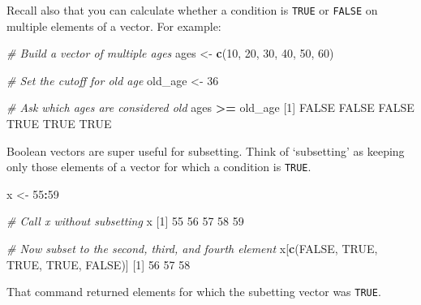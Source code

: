 \documentclass[
]{book}
\newenvironment{Shaded}{\begin{snugshade}}{\end{snugshade}}
\newcommand{\CommentTok}[1]{\textcolor[rgb]{0.56,0.35,0.01}{\textit{#1}}}
\newcommand{\ConstantTok}[1]{\textcolor[rgb]{0.56,0.35,0.01}{#1}}
\newcommand{\DecValTok}[1]{\textcolor[rgb]{0.00,0.00,0.81}{#1}}
\newcommand{\FunctionTok}[1]{\textcolor[rgb]{0.13,0.29,0.53}{\textbf{#1}}}
\newcommand{\NormalTok}[1]{#1}
\newcommand{\OtherTok}[1]{\textcolor[rgb]{0.56,0.35,0.01}{#1}}
\newcommand{\SpecialCharTok}[1]{\textcolor[rgb]{0.81,0.36,0.00}{\textbf{#1}}}
\begin{document}
Recall also that you can calculate whether a condition is \texttt{TRUE} or \texttt{FALSE} on multiple elements of a vector. For example:

\begin{Shaded}
\begin{Highlighting}[]
\CommentTok{\# Build a vector of multiple ages}
\NormalTok{ages }\OtherTok{\textless{}{-}} \FunctionTok{c}\NormalTok{(}\DecValTok{10}\NormalTok{, }\DecValTok{20}\NormalTok{, }\DecValTok{30}\NormalTok{, }\DecValTok{40}\NormalTok{, }\DecValTok{50}\NormalTok{, }\DecValTok{60}\NormalTok{)}

\CommentTok{\# Set the cutoff for old age}
\NormalTok{old\_age }\OtherTok{\textless{}{-}} \DecValTok{36}

\CommentTok{\# Ask which ages are considered old}
\NormalTok{ages }\SpecialCharTok{\textgreater{}=}\NormalTok{ old\_age}
\NormalTok{[}\DecValTok{1}\NormalTok{] }\ConstantTok{FALSE} \ConstantTok{FALSE} \ConstantTok{FALSE}  \ConstantTok{TRUE}  \ConstantTok{TRUE}  \ConstantTok{TRUE}
\end{Highlighting}
\end{Shaded}

Boolean vectors are super useful for subsetting. Think of `subsetting' as keeping only those elements of a vector for which a condition is \texttt{TRUE}.

\begin{Shaded}
\begin{Highlighting}[]
\NormalTok{x }\OtherTok{\textless{}{-}} \DecValTok{55}\SpecialCharTok{:}\DecValTok{59}

\CommentTok{\# Call x without subsetting}
\NormalTok{x}
\NormalTok{[}\DecValTok{1}\NormalTok{] }\DecValTok{55} \DecValTok{56} \DecValTok{57} \DecValTok{58} \DecValTok{59}
\end{Highlighting}
\end{Shaded}

\begin{Shaded}
\begin{Highlighting}[]
\CommentTok{\# Now subset to the second, third, and fourth element}
\NormalTok{x[}\FunctionTok{c}\NormalTok{(}\ConstantTok{FALSE}\NormalTok{, }\ConstantTok{TRUE}\NormalTok{, }\ConstantTok{TRUE}\NormalTok{, }\ConstantTok{TRUE}\NormalTok{, }\ConstantTok{FALSE}\NormalTok{)]}
\NormalTok{[}\DecValTok{1}\NormalTok{] }\DecValTok{56} \DecValTok{57} \DecValTok{58}
\end{Highlighting}
\end{Shaded}

That command returned elements for which the subetting vector was \texttt{TRUE}.
\end{document}
